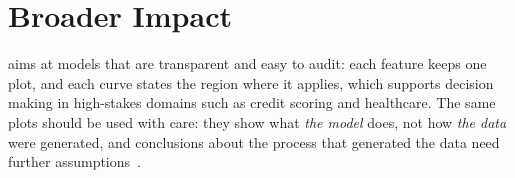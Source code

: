 \clearpage
\section{Broader Impact}\label{app:broader-impact}
\method{} aims at models that are transparent and easy to audit: each feature keeps one plot, and each curve states the region where it applies, which supports decision making in high-stakes domains such as credit scoring and healthcare. The same plots should be used with care: they show what \emph{the model} does, not how \emph{the data} were generated, and conclusions about the process that generated the data need further assumptions~\cite{freiesleben2024scientific}.

\newpage
